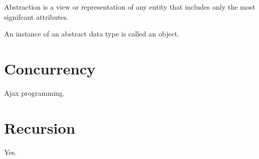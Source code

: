 \documentclass[man]{apa}
\begin{document}
Abstraction is a view or representation of any entity that includes only the most signifcant attributes.

An instance of an abstract data type is called an object.

\section{Concurrency}

Ajax programming.

\section{Recursion}

Yes.

\end{document}
